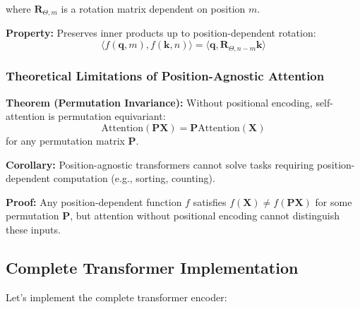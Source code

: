 where $\mathbf{R}_{\Theta,m}$ is a rotation matrix dependent on position $m$.

\textbf{Property:} Preserves inner products up to position-dependent rotation:
\begin{equation}
\langle f(\mathbf{q}, m), f(\mathbf{k}, n) \rangle = \langle \mathbf{q}, \mathbf{R}_{\Theta,n-m} \mathbf{k} \rangle
\end{equation}

\subsubsection{Theoretical Limitations of Position-Agnostic Attention}

\textbf{Theorem (Permutation Invariance):} Without positional encoding, self-attention is permutation equivariant:
\begin{equation}
\text{Attention}(\mathbf{P}\mathbf{X}) = \mathbf{P}\text{Attention}(\mathbf{X})
\end{equation}
for any permutation matrix $\mathbf{P}$.

\textbf{Corollary:} Position-agnostic transformers cannot solve tasks requiring position-dependent computation (e.g., sorting, counting).

\textbf{Proof:} Any position-dependent function $f$ satisfies $f(\mathbf{X}) \neq f(\mathbf{P}\mathbf{X})$ for some permutation $\mathbf{P}$, but attention without positional encoding cannot distinguish these inputs.

\subsection{Complete Transformer Implementation}

Let's implement the complete transformer encoder:

